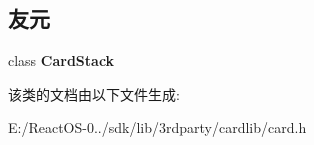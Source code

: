 \subsection*{友元}
\begin{DoxyCompactItemize}
\item 
\mbox{\label{class_card_a9a1d66e122f537626f29525c9a1a5c99}} 
class {\bfseries Card\+Stack}
\end{DoxyCompactItemize}


该类的文档由以下文件生成\+:\begin{DoxyCompactItemize}
\item 
E\+:/\+React\+O\+S-\/0../sdk/lib/3rdparty/cardlib/card.\+h\end{DoxyCompactItemize}
